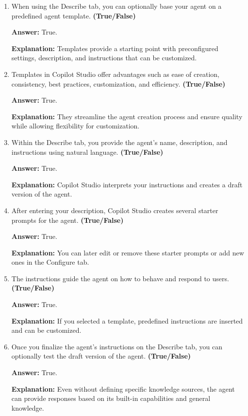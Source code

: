 \documentclass[10pt]{article}
\begin{document}
\begin{enumerate}[leftmargin=*]
\item When using the Describe tab, you can optionally base your agent on a predefined agent template. \textbf{(True/False)}

\textbf{Answer:} True.

\textbf{Explanation:} Templates provide a starting point with preconfigured settings, description, and instructions that can be customized.

\item Templates in Copilot Studio offer advantages such as ease of creation, consistency, best practices, customization, and efficiency. \textbf{(True/False)}

\textbf{Answer:} True.

\textbf{Explanation:} They streamline the agent creation process and ensure quality while allowing flexibility for customization.

\item Within the Describe tab, you provide the agent’s name, description, and instructions using natural language. \textbf{(True/False)}

\textbf{Answer:} True.

\textbf{Explanation:} Copilot Studio interprets your instructions and creates a draft version of the agent.

\item After entering your description, Copilot Studio creates several starter prompts for the agent. \textbf{(True/False)}

\textbf{Answer:} True.

\textbf{Explanation:} You can later edit or remove these starter prompts or add new ones in the Configure tab.

\item The instructions guide the agent on how to behave and respond to users. \textbf{(True/False)}

\textbf{Answer:} True.

\textbf{Explanation:} If you selected a template, predefined instructions are inserted and can be customized.

\item Once you finalize the agent’s instructions on the Describe tab, you can optionally test the draft version of the agent. \textbf{(True/False)}

\textbf{Answer:} True.

\textbf{Explanation:} Even without defining specific knowledge sources, the agent can provide responses based on its built-in capabilities and general knowledge.


\end{enumerate}
\end{document}
